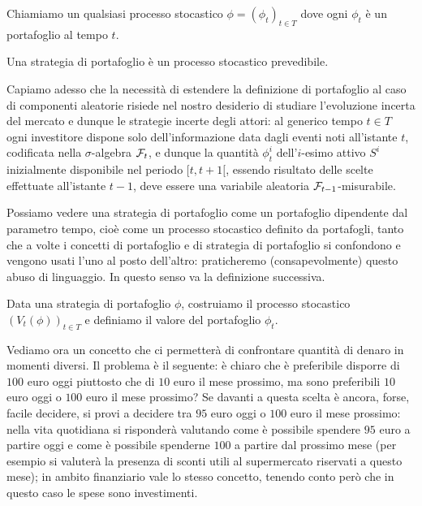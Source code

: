 \begin{Definition}
	Chiamiamo  un qualsiasi processo stocastico $\phi = (\phi_t)_{t \in T}$ dove ogni $\phi_t$ \`e un portafoglio al tempo $t$.
\end{Definition}
\par Una strategia di portafoglio \`e un processo stocastico prevedibile.
\par Capiamo adesso che la necessit\`a di estendere la definizione di portafoglio al caso di componenti aleatorie risiede nel nostro desiderio di studiare l'evoluzione incerta del mercato e dunque le strategie incerte degli attori: al generico tempo $t \in T$ ogni investitore dispone solo dell'informazione data dagli eventi noti all'istante $t$, codificata nella $\sigma$-algebra $\mathcal{F}_t$, e dunque la quantit\`a $\phi^i_t$ dell'$i$-esimo attivo $S^i$ inizialmente disponibile nel periodo $[t,t + 1[$, essendo risultato delle scelte effettuate all'istante $t - 1$, deve essere una variabile aleatoria $\mathcal{F}_{t - 1}$-misurabile.
\par Possiamo vedere una strategia di portafoglio come un portafoglio dipendente dal parametro tempo, cio\`e come un processo stocastico definito da portafogli, tanto che a volte i concetti di portafoglio e di strategia di portafoglio si confondono e vengono usati l'uno al posto dell'altro: praticheremo (consapevolmente) questo abuso di linguaggio. In questo senso va la definizione successiva.
\begin{Definition}
	Data una strategia di portafoglio $\phi$, costruiamo il processo stocastico $(V_t(\phi))_{t \in T}$ e definiamo  il valore del portafoglio $\phi_t$.
\end{Definition}
\par Vediamo ora un concetto che ci permetter\`a di confrontare quantit\`a di denaro in momenti diversi. Il problema \`e il seguente: \`e chiaro che \`e preferibile disporre di $100$ euro oggi piuttosto che di $10$ euro il mese prossimo, ma sono preferibili $10$ euro oggi o $100$ euro il mese prossimo? Se davanti a questa scelta \`e ancora, forse, facile decidere, si provi a decidere tra $95$ euro oggi o $100$ euro il mese prossimo: nella vita quotidiana si risponder\`a valutando come \`e possibile spendere $95$ euro a partire oggi e come \`e possibile spenderne $100$ a partire dal prossimo mese (per esempio si valuter\`a la presenza di sconti utili al supermercato riservati a questo mese); in ambito finanziario vale lo stesso concetto, tenendo conto per\`o che in questo caso le spese sono investimenti.
